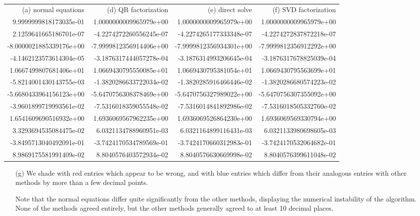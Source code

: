 \documentclass[10pt]{article}
\begin{document}
\begin{solution}[Solution]
{\tt\scriptsize
\begin{tabular}{rrrr}
    \textrm{(a) normal equations} & \textrm{(d) QR factorization} & \textrm{(e) direct solve} & \textrm{(f) SVD factorization} \\
    9.9999999818173035e-01 &  \phantom{-}1.0000000009965979e+00  &  1.0000000009965979e+00  & 1.0000000009965979e+00 \\
    \color{red} 2.1259641665186701e-07 & -4.2274272260556245e-07  & -4.2274265177333348e-07 & -4.2274272837872218e-07 \\
 -8.0000021885339176e+00 & -7.9999812356914406e+00  & -7.9999812356934301e+00 & -7.9999812356912292e+00 \\
    \color{red} -4.1462123573614304e-05 & -3.1876317444057278e-04  & -3.1876314993206645e-04 & -3.1876317678825039e-04 \\
  1.0667499807681406e+01 &  1.0669430795550085e+01  &  1.0669430795381054e+01 &  1.0669430795563699e+01 \\
    \color{red} -5.8214001430143755e-03 & -1.3820286633722034e-02  & -1.3820285916466446e-02 & -1.3820286680574223e-02 \\
    \color{blue} -5.6680433964156123e+00 & -5.6470756308378469e+00  & -5.6470756327989022e+00 & -5.6470756307355092e+00 \\
    \color{red} -3.9601899719993561e-02 & -7.5316018359055548e-02  & -7.5316014841892986e-02 & -7.5316018505332760e-02 \\
    \color{blue} 1.6541609690516932e+00 &  1.6936069567962235e+00  &  1.6936069526864230e+00 &  1.6936069569330794e+00 \\
    \color{red} 3.3293694535084475e-02 &  6.0321134788960951e-03  &  6.0321164899116431e-03 &  6.0321133980698605e-03 \\
    \color{blue} -3.8495713040492091e-01 & -3.7424170534789569e-01  & -3.7424170660312983e-01 & -3.7424170532064682e-01 \\
    \color{blue} 8.9869175581991409e-02 &  8.8040576403572934e-02  &  8.8040576630669998e-02 &  8.8040576399611048e-02 
\end{tabular}
}
\begin{enumerate}
    \item[(g)] We shade with red entries which appear to be wrong, and with blue entries which differ from their analogous entries with other methods by more than a few decimal points. 

        Note that the normal equations differ quite significantly from the other methods, displaying the numerical instability of the algorithm. None of the methods agreed entirely, but the other methods generally agreed to at least 10 decimal places. 
\end{enumerate}

\end{solution}
\end{document}
